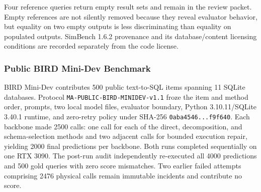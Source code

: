 \documentclass[applsci,article,submit,moreauthors]{Definitions/mdpi}
\begin{document}
Four reference queries return empty result sets and remain in the review packet. Empty references are not silently removed because they reveal evaluator behavior, but equality on two empty outputs is less discriminating than equality on populated outputs. SimBench 1.6.2 provenance and its database/content licensing conditions are recorded separately from the code license.

\subsubsection{Public BIRD Mini-Dev Benchmark}
BIRD Mini-Dev contributes 500 public text-to-SQL items spanning 11 SQLite databases. Protocol \texttt{MA-PUBLIC-BIRD-MINIDEV-v1.1} froze the item and method order, prompts, two local model files, evaluator boundary, Python 3.10.11/SQLite 3.40.1 runtime, and zero-retry policy under SHA-256 \texttt{0aba4546...f9f640}. Each backbone made 2500 calls: one call for each of the direct, decomposition, and schema-selection methods and two adjacent calls for bounded execution repair, yielding 2000 final predictions per backbone. Both runs completed sequentially on one RTX 3090. The post-run audit independently re-executed all 4000 predictions and 500 gold queries with zero score mismatches. Two earlier failed attempts comprising 2476 physical calls remain immutable incidents and contribute no score.

\begin{table}[H]
\caption{Data resources and their permitted evidence role. Silver denotes machine-adjudicated labels, not human or domain-expert gold.}\label{tab:data}
\centering{}
\end{table}
\end{document}
